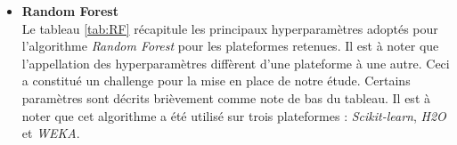 \begin{itemize}
    \item[\ding{233}]\textbf{Random Forest}\\%
    
    Le tableau  \ref{tab:RF} récapitule les principaux hyperparamètres adoptés pour l'algorithme \textit{Random Forest} pour les plateformes retenues. Il est à noter que l'appellation des hyperparamètres diffèrent d'une plateforme à une autre. Ceci a constitué un challenge pour la mise en place de notre étude. Certains paramètres sont décrits brièvement comme note de bas du tableau. Il est à noter que cet algorithme a été utilisé sur trois plateformes : \textit{Scikit-learn}, \textit{H2O} et \textit{WEKA}.\\
\\
\\


\end{itemize}
